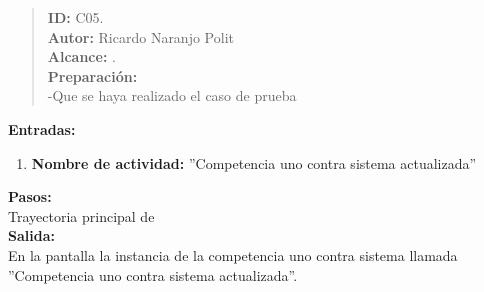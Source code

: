 
\begin{quote} %
	\textbf{ID:} C05.\\
    \textbf{Autor: } Ricardo Naranjo Polit\\
	\textbf{Alcance:}  .\\
    \textbf{Preparación:}\\
      -Que se haya realizado el caso de prueba \\

\end{quote}

    \textbf{Entradas:}\\
    \begin{enumerate}
        \item \textbf{Nombre de actividad:} ''Competencia uno contra sistema actualizada''
    \end{enumerate}
    \textbf{Pasos:}\\

    Trayectoria principal de \\

    \textbf{Salida:}\\

     En la pantalla  la instancia de la competencia uno contra sistema llamada ''Competencia uno contra sistema actualizada''.
